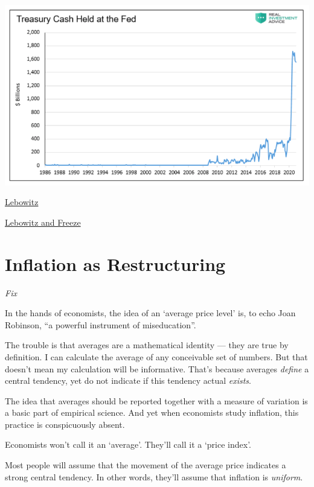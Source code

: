 \documentclass[
]{book}
\begin{document}
\includegraphics{fig/Treasury_cash_at_FED.png}

\href{https://www.seeitmarket.com/is-inflation-coming-in-2021-watch-money-supply-and-velocity/}{Lebowitz}

\href{https://realinvestmentadvice.com/stoking-the-embers-of-inflation/}{Lebowitz and Freeze}

\hypertarget{inflation-as-restructuring}{%
\section{Inflation as Restructuring}\label{inflation-as-restructuring}}

\emph{Fix}

In the hands of economists, the idea of an `average price level' is, to echo Joan Robinson, ``a powerful instrument of miseducation''.

The trouble is that averages are a mathematical identity --- they are true by definition. I can calculate the average of any conceivable set of numbers. But that doesn't mean my calculation will be informative. That's because averages \emph{define} a central tendency, yet do not indicate if this tendency actual \emph{exists}.

The idea that averages should be reported together with a measure of variation is a basic part of empirical science. And yet when economists study inflation, this practice is conspicuously absent.

Economists won't call it an `average'. They'll call it a `price index'.

Most people will assume that the movement of the average price indicates a strong central tendency. In other words, they'll assume that inflation is \emph{uniform}.
\end{document}
